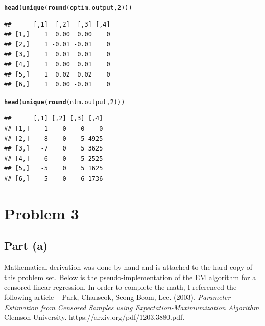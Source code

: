 \documentclass{article}\usepackage[]{graphicx}\usepackage[]{color}
\makeatletter
\newcommand{\hlnum}[1]{\textcolor[rgb]{0.686,0.059,0.569}{#1}}%
\newcommand{\hlstd}[1]{\textcolor[rgb]{0.345,0.345,0.345}{#1}}%
\newcommand{\hlkwd}[1]{\textcolor[rgb]{0.737,0.353,0.396}{\textbf{#1}}}%
\newenvironment{kframe}{%
 \def\at@end@of@kframe{}%
 \ifinner\ifhmode%
  \def\at@end@of@kframe{\end{minipage}}%
  \begin{minipage}{\columnwidth}%
 \fi\fi%
 \def\FrameCommand##1{\hskip\@totalleftmargin \hskip-\fboxsep
 \colorbox{shadecolor}{##1}\hskip-\fboxsep
     \hskip-\linewidth \hskip-\@totalleftmargin \hskip\columnwidth}%
 \MakeFramed {\advance\hsize-\width
   \@totalleftmargin\z@ \linewidth\hsize
   \@setminipage}}%
 {\par\unskip\endMakeFramed%
 \at@end@of@kframe}
\newenvironment{knitrout}{}{} %
\makeatother
\begin{document}
\begin{knitrout}
\begin{kframe}
\begin{alltt}
\hlkwd{head}\hlstd{(}\hlkwd{unique}\hlstd{(}\hlkwd{round}\hlstd{(optim.output,} \hlnum{2}\hlstd{)))}
\end{alltt}
\begin{verbatim}
##      [,1]  [,2]  [,3] [,4]
## [1,]    1  0.00  0.00    0
## [2,]    1 -0.01 -0.01    0
## [3,]    1  0.01  0.01    0
## [4,]    1  0.00  0.01    0
## [5,]    1  0.02  0.02    0
## [6,]    1  0.00 -0.01    0
\end{verbatim}
\begin{alltt}
\hlkwd{head}\hlstd{(}\hlkwd{unique}\hlstd{(}\hlkwd{round}\hlstd{(nlm.output,} \hlnum{2}\hlstd{)))}
\end{alltt}
\begin{verbatim}
##      [,1] [,2] [,3] [,4]
## [1,]    1    0    0    0
## [2,]   -8    0    5 4925
## [3,]   -7    0    5 3625
## [4,]   -6    0    5 2525
## [5,]   -5    0    5 1625
## [6,]   -5    0    6 1736
\end{verbatim}
\end{kframe}
\end{knitrout}
\section{Problem 3}
\subsection{Part (a)}
Mathematical derivation was done by hand and is attached to the hard-copy of this problem set.  Below is the pseudo-implementation of the EM algorithm for a censored linear regression.  In order to complete the math, I referenced the following article --
\newline
\newline
Park, Chanseok, Seong Beom, Lee. (2003). \emph{Parameter Estimation from Censored Samples using Expectation-Maximumization Algorithm}. Clemson University. https://arxiv.org/pdf/1203.3880.pdf.
\end{document}
